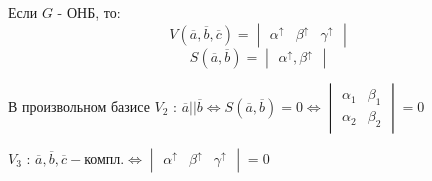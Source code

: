 \begin{consequence}
Если $G$ - ОНБ, то:
\[
  V\left(\overline{a}, \overline{b}, \overline{c}\right) = \begin{vmatrix}\alpha^{\uparrow} & \beta^{\uparrow} & \gamma^{\uparrow} \end{vmatrix}
\]
\[
S\left(\overline{a}, \overline{b}\right) = \begin{vmatrix}\alpha^{\uparrow}, \beta^{\uparrow} \end{vmatrix}
\]
\end{consequence}
\begin{consequence}
  В произвольном базисе $V_2$ : $\overline{a} || \overline{b} \iff S\left(\overline{a}, \overline{b}\right) = 0 \iff \begin{vmatrix} \alpha_1 & \beta_1 \\ \alpha_2 & \beta_2 \end{vmatrix} = 0$

  $V_3$ : $\overline{a}, \overline{b}, \overline{c} - \text{компл.} \iff \begin{vmatrix}\alpha^{\uparrow} & \beta^{\uparrow} & \gamma^{\uparrow} \end{vmatrix} = 0$
\end{consequence}

